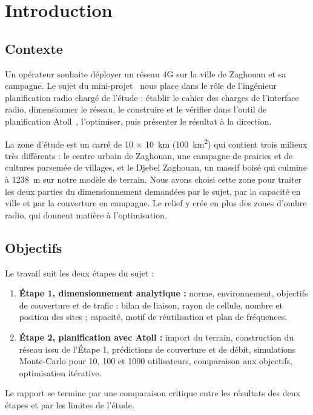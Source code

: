 \chapter{Introduction}
\label{ch-intro}

\section{Contexte}

Un opérateur souhaite déployer un réseau 4G sur la ville de Zaghouan et sa campagne. Le sujet du mini-projet~\cite{afif2026sujet} nous place dans le rôle de l'ingénieur planification radio chargé de l'étude : établir le cahier des charges de l'interface radio, dimensionner le réseau, le construire et le vérifier dans l'outil de planification Atoll~\cite{atoll33}, l'optimiser, puis présenter le résultat à la direction.

La zone d'étude est un carré de \num{10} × \SI{10}{\kilo\metre} (\SI{100}{\kilo\metre\squared}) qui contient trois milieux très différents : le centre urbain de Zaghouan, une campagne de prairies et de cultures parsemée de villages, et le Djebel Zaghouan, un massif boisé qui culmine à \SI{1238}{\metre} sur notre modèle de terrain. Nous avons choisi cette zone pour traiter les deux parties du dimensionnement demandées par le sujet, par la capacité en ville et par la couverture en campagne. Le relief y crée en plus des zones d'ombre radio, qui donnent matière à l'optimisation.

\section{Objectifs}

Le travail suit les deux étapes du sujet :
\begin{enumerate}
  \item \textbf{Étape 1, dimensionnement analytique :} norme, environnement, objectifs de couverture et de trafic ; bilan de liaison, rayon de cellule, nombre et position des sites ; capacité, motif de réutilisation et plan de fréquences.
  \item \textbf{Étape 2, planification avec Atoll :} import du terrain, construction du réseau issu de l'Étape 1, prédictions de couverture et de débit, simulations Monte-Carlo pour 10, 100 et \num{1000} utilisateurs, comparaison aux objectifs, optimisation itérative.
\end{enumerate}
Le rapport se termine par une comparaison critique entre les résultats des deux étapes et par les limites de l'étude.

